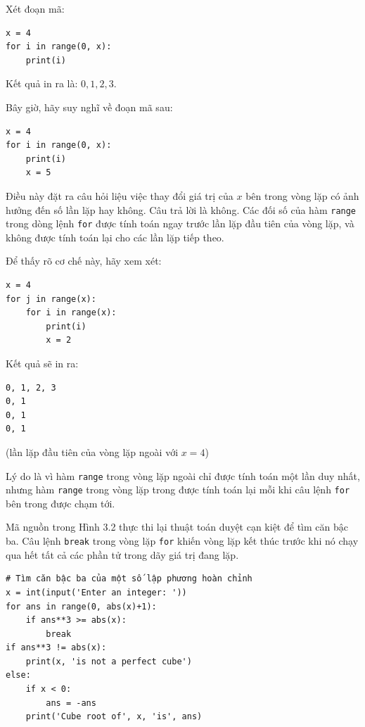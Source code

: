 Xét đoạn mã:

\begin{verbatim}
x = 4
for i in range(0, x):
    print(i)
\end{verbatim}

Kết quả in ra là: $0, 1, 2, 3$.

Bây giờ, hãy suy nghĩ về đoạn mã sau:

\begin{verbatim}
x = 4
for i in range(0, x):
    print(i)
    x = 5
\end{verbatim}

Điều này đặt ra câu hỏi liệu việc thay đổi giá trị của $x$ bên trong vòng lặp có ảnh hưởng đến số lần lặp hay không. Câu trả lời là không. Các đối số của hàm \texttt{range} trong dòng lệnh \texttt{for} được tính toán ngay trước lần lặp đầu tiên của vòng lặp, và không được tính toán lại cho các lần lặp tiếp theo.

Để thấy rõ cơ chế này, hãy xem xét:

\begin{verbatim}
x = 4
for j in range(x):
    for i in range(x):
        print(i)
        x = 2
\end{verbatim}

Kết quả sẽ in ra:

\begin{verbatim}
0, 1, 2, 3
0, 1
0, 1
0, 1
\end{verbatim}

(lần lặp đầu tiên của vòng lặp ngoài với $x=4$)

Lý do là vì hàm \texttt{range} trong vòng lặp ngoài chỉ được tính toán một lần duy nhất, nhưng hàm \texttt{range} trong vòng lặp trong được tính toán lại mỗi khi câu lệnh \texttt{for} bên trong được chạm tới.

Mã nguồn trong Hình 3.2 thực thi lại thuật toán duyệt cạn kiệt để tìm căn bậc ba. Câu lệnh \texttt{break} trong vòng lặp \texttt{for} khiến vòng lặp kết thúc trước khi nó chạy qua hết tất cả các phần tử trong dãy giá trị đang lặp.

\begin{tcolorbox}[title=Hình 3.2: Sử dụng câu lệnh \texttt{for} và \texttt{break}]

\begin{verbatim}
# Tìm căn bậc ba của một số lập phương hoàn chỉnh
x = int(input('Enter an integer: '))
for ans in range(0, abs(x)+1):
    if ans**3 >= abs(x):
        break
if ans**3 != abs(x):
    print(x, 'is not a perfect cube')
else:
    if x < 0:
        ans = -ans
    print('Cube root of', x, 'is', ans)
\end{verbatim}

\end{tcolorbox}

